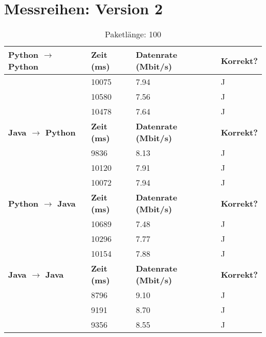 \documentclass{article}
\begin{document}
    \section{Messreihen: Version 2}\label{sec:messreihen:-version-2}
    \begin{table}[]
        \caption{Paketlänge: 100}
        \label{tab:my-tablev2_100}
        \begin{tabular}{|l|l|l|l|}
            \hline
            \textbf{Python $\rightarrow$ Python} & \textbf{Zeit (ms)} & \textbf{Datenrate (Mbit/s)} & \textbf{Korrekt?} \\ \hline
            & 10075      & 7.94         & J        \\ \cline{2-4}
            & 10580      & 7.56         & J        \\ \cline{2-4}
            & 10478      & 7.64         & J        \\ \hline
            \textbf{Java $\rightarrow$ Python}   & \textbf{Zeit (ms)} & \textbf{Datenrate (Mbit/s)} & \textbf{Korrekt?} \\ \hline
            & 9836       & 8.13         & J        \\ \cline{2-4}
            & 10120      & 7.91         & J        \\ \cline{2-4}
            & 10072      & 7.94         & J        \\ \hline
            \textbf{Python $\rightarrow$ Java}  & \textbf{Zeit (ms)} & \textbf{Datenrate (Mbit/s)} & \textbf{Korrekt?} \\ \hline
            & 10689      & 7.48         & J        \\ \cline{2-4}
            & 10296      & 7.77         & J        \\ \cline{2-4}
            & 10154      & 7.88         & J        \\ \hline
            \textbf{Java $\rightarrow$ Java}   & \textbf{Zeit (ms)} & \textbf{Datenrate (Mbit/s)} & \textbf{Korrekt?} \\ \hline
            & 8796       & 9.10         & J        \\ \cline{2-4}
            & 9191       & 8.70         & J        \\ \cline{2-4}
            & 9356       & 8.55         & J        \\ \hline
        \end{tabular}
    \end{table}
\end{document}
